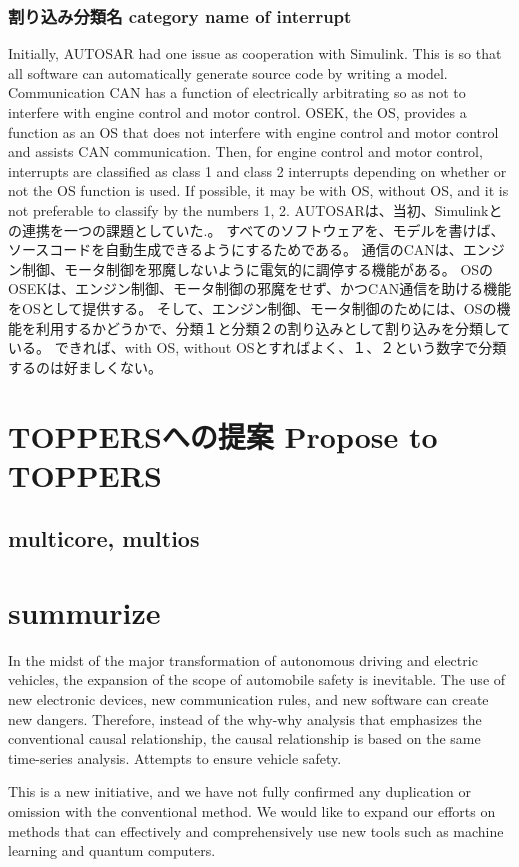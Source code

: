 \documentclass[twocolumn]{article} %
\begin{document}
\subsubsection{割り込み分類名 category name of interrupt}
Initially, AUTOSAR had one issue as cooperation with Simulink\cite{simulink}.
This is so that all software can automatically generate source code by writing a model.
Communication CAN has a function of electrically arbitrating so as not to interfere with engine control and motor control.
OSEK, the OS, provides a function as an OS that does not interfere with engine control and motor control and assists CAN communication.
Then, for engine control and motor control, interrupts are classified as class 1 and class 2 interrupts depending on whether or not the OS function is used.
If possible, it may be with OS, without OS, and it is not preferable to classify by the numbers 1, 2.
AUTOSARは、当初、Simulinkとの連携を一つの課題としていた\cite{simulink}.。
すべてのソフトウェアを、モデルを書けば、ソースコードを自動生成できるようにするためである。
通信のCANは、エンジン制御、モータ制御を邪魔しないように電気的に調停する機能がある。
OSのOSEKは、エンジン制御、モータ制御の邪魔をせず、かつCAN通信を助ける機能をOSとして提供する。
そして、エンジン制御、モータ制御のためには、OSの機能を利用するかどうかで、分類１と分類２の割り込みとして割り込みを分類している。
できれば、with OS, without OSとすればよく、１、２という数字で分類するのは好ましくない。
\section{TOPPERSへの提案 Propose to TOPPERS}
\subsection{multicore, multios}

\section{summurize}
In the midst of the major transformation of autonomous driving and electric vehicles, the expansion of the scope of automobile safety is inevitable.
The use of new electronic devices, new communication rules, and new software can create new dangers.
Therefore, instead of the why-why analysis that emphasizes the conventional causal relationship, the causal relationship is based on the same time-series analysis.
Attempts to ensure vehicle safety.

This is a new initiative, and we have not fully confirmed any duplication or omission with the conventional method.
We would like to expand our efforts on methods that can effectively and comprehensively use new tools such as machine learning and quantum computers.
\end{document}
